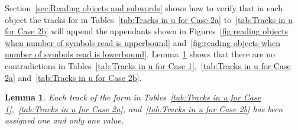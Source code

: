 \documentclass[11pt]{article} \usepackage{amsfonts,amsmath,amssymb,amsthm}
\newtheorem{lemma}{Lemma}
\begin{document}
Section~\ref{sec:Reading objects and  subwords} shows how to verify that in each object the tracks for  in Tables~\ref{tab:Tracks in u for Case 2a} to~\ref{tab:Tracks in u for Case 2b} will append the appendants shown in Figures~\ref{fig:reading objects when number of symbols read is upperbound} and~\ref{fig:reading objects when number of symbols read is lowerbound}.
Lemma~\ref{lem:Correctness of u} shows that there are no contradictions in Tables~\ref{tab:Tracks in u for Case 1},~\ref{tab:Tracks in u for Case 2a} and~\ref{tab:Tracks in u for Case 2b}.
\begin{lemma}\label{lem:Correctness of u}
Each track of the form  in Tables~\ref{tab:Tracks in u for Case 1},~\ref{tab:Tracks in u for Case 2a}, and~\ref{tab:Tracks in u for Case 2b} has been assigned one and only one value.  
\end{lemma}
\end{document}
